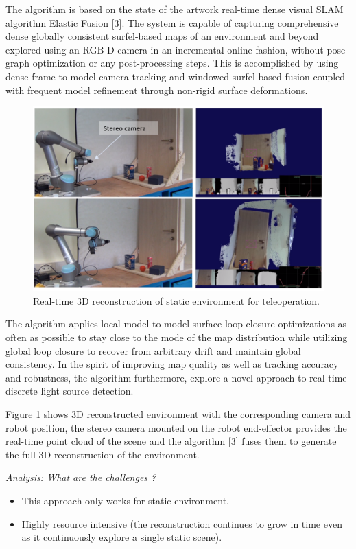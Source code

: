 The algorithm is based on the state of the artwork real-time dense visual SLAM algorithm Elastic Fusion [3]. The system is capable of capturing comprehensive dense globally consistent surfel-based maps of an environment and beyond explored using an RGB-D camera in an incremental online fashion, without pose graph optimization or any post-processing steps. This is accomplished by using dense frame-to model camera tracking and windowed surfel-based fusion coupled with frequent model refinement through non-rigid surface deformations.

\begin{figure}[h]
    \centering
    \includegraphics[scale=0.5]{images/Elastic_Fusion.PNG}
    \caption{Real-time 3D reconstruction of static environment for teleoperation.}
    \label{fig:Elastic}
\end{figure}

The algorithm applies local model-to-model surface loop closure optimizations as often as possible to stay close to the mode of the map distribution while utilizing global loop closure to recover from arbitrary drift and maintain global consistency. In the spirit of improving map quality as well as tracking accuracy and robustness, the algorithm furthermore, explore a novel approach to real-time discrete light source detection.

Figure \ref{fig:Elastic} shows 3D reconstructed environment with the corresponding camera and robot position, the stereo camera mounted on the robot end-effector provides the real-time point cloud of the scene and   the algorithm [3] fuses them to generate the full 3D reconstruction of the environment.

\textit{Analysis: What are the challenges ?}
\begin{itemize}
    \item This approach only works for static environment.
    \item Highly resource intensive (the reconstruction continues to grow in time even as it continuously explore a
single static scene).
\end{itemize}

